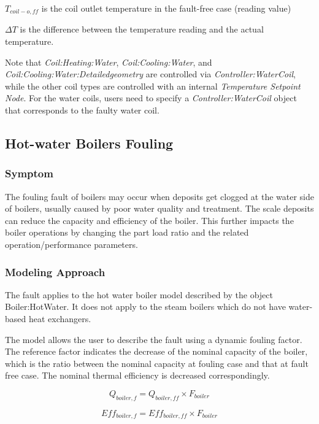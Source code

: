 \(T_{coil-o,ff}\) is the coil outlet temperature in the fault-free case (reading value)

\(\Delta T\) is the difference between the temperature reading and the actual temperature.

Note that \emph{Coil:Heating:Water}, \emph{Coil:Cooling:Water}, and \emph{Coil:Cooling:Water:Detailedgeometry} are controlled via \emph{Controller:WaterCoil}, while the other coil types are controlled with an internal \emph{Temperature Setpoint Node}. For the water coils, users need to specify a \emph{Controller:WaterCoil} object that corresponds to the faulty water coil.


\subsection{Hot-water Boilers Fouling}\label{hot-water-boiler-fouling}

\subsubsection{Symptom}

The fouling fault of boilers may occur when deposits get clogged at the water side of boilers, usually caused by poor water quality and treatment. The scale deposits can reduce the capacity and efficiency of the boiler. This further impacts the boiler operations by changing the part load ratio and the related operation/performance parameters.

\subsubsection{Modeling Approach}

The fault applies to the hot water boiler model described by the object Boiler:HotWater. It does not apply to the steam boilers which do not have water-based heat exchangers.

The model allows the user to describe the fault using a dynamic fouling factor. The reference factor indicates the decrease of the nominal capacity of the boiler, which is the ratio between the nominal capacity at fouling case and that at fault free case. The nominal thermal efficiency is decreased correspondingly.

\begin{equation}
Q_{boiler,f} = Q_{boiler,ff} \times F_{boiler}
\end{equation}

\begin{equation}
Eff_{boiler,f} = Eff_{boiler,ff} \times F_{boiler}
\end{equation}

